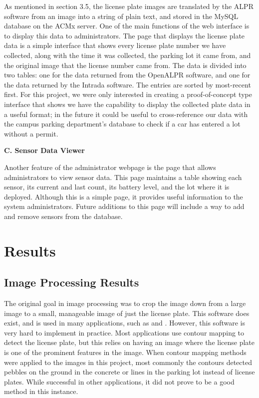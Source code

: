 \documentclass[11pt, oneside, fullpage, doublespace]{article}
\begin{document}
As mentioned in section 3.5, the license plate images are translated by the ALPR software from an image into a string of plain text, and stored in the MySQL database on the ACMx server. One of the main functions of the web interface is to display this data to administrators. The page that displays the license plate data is a simple interface that shows every license plate number we have collected, along with the time it was collected, the parking lot it came from, and the original image that the license number came from. The data is divided into two tables: one for the data returned from the OpenALPR software, and one for the data returned by the Intrada software. The entries are sorted by most-recent first. For this project, we were only interested in creating a proof-of-concept type interface that shows we have the capability to display the collected plate data in a useful format; in the future it could be useful to cross-reference our data with the campus parking department's database to check if a car has entered a lot without a permit.

\textbf{C. Sensor Data Viewer}

Another feature of the administrator webpage is the page that allows administrators to view sensor data. This page maintains a table showing each sensor, its current and last count, its battery level, and the lot where it is deployed. Although this is a simple page, it provides useful information to the system administrators. Future additions to this page will include a way to add and remove sensors from the database.

\section{Results}

\subsection{Image Processing Results}

The original goal in image processing was to crop the image down from a large image to a small, manageable image of just the license plate. This software does exist, and is used in many applications, such as \cite{du2013} and \cite{e470}. However, this software is very hard to implement in practice. Most applications use contour mapping to detect the license plate, but this relies on having an image where the license plate is one of the prominent features in the image. When contour mapping methods were applied to the images in this project, most commonly the contours detected pebbles on the ground in the concrete or lines in the parking lot instead of license plates. While successful in other applications, it did not prove to be a good method in this instance.
\end{document}
